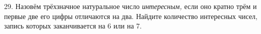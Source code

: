 29. Назовём трёхзначное натуральное число {\it интересным,} если оно кратно трём и первые две его цифры отличаются на два. Найдите количество интересных чисел, запись которых заканчивается на 6 или на 7.\\
